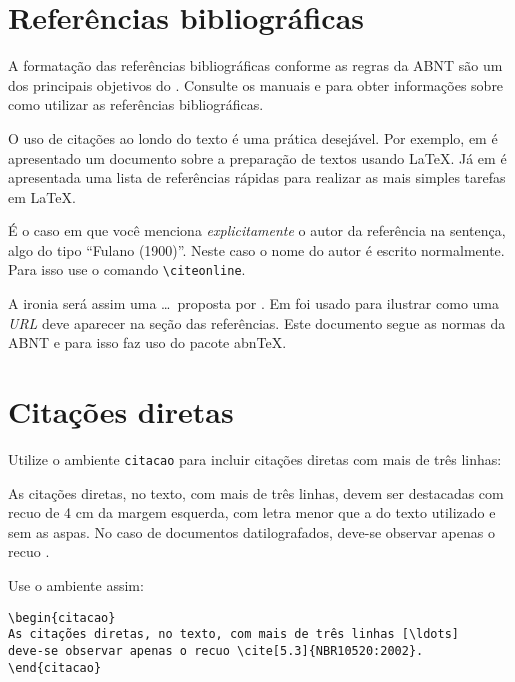 \section{Referências bibliográficas}\label{sec:referencias}

A formatação das referências bibliográficas conforme as regras da ABNT são um dos principais objetivos do \abnTeX. Consulte os manuais  e  para obter informações sobre como utilizar as referências bibliográficas.


O uso de citações ao londo do texto é uma prática desejável. Por exemplo, em \cite{lamport94} é apresentado um documento sobre a preparação de textos usando \LaTeX. Já em \cite{goossens94} é apresentada uma lista de referências rápidas para realizar as mais simples tarefas em \LaTeX.

É o caso em que você menciona \emph{explicitamente} o autor da referência na sentença, algo
do tipo ``Fulano (1900)''. Neste caso o nome do autor é escrito
normalmente. Para isso use o comando \verb+\citeonline+.

A ironia será assim uma \ldots\ proposta  por . Em \cite{exemplo} foi usado para ilustrar como uma \textit{URL} deve aparecer na seção das referências. Este documento segue as normas da \gls{ABNT} e para isso faz uso do pacote \gls{abnTeX}.


\section{Citações diretas}
\label{sec-citacao}

Utilize o ambiente \texttt{citacao} para incluir
citações diretas com mais de três linhas:

\begin{citacao}
    As citações diretas, no texto, com mais de três linhas, devem ser
    destacadas com recuo de 4 cm da margem esquerda, com letra menor que a do texto
    utilizado e sem as aspas. No caso de documentos datilografados, deve-se
    observar apenas o recuo \cite[5.3]{NBR10520:2002}.
\end{citacao}

Use o ambiente assim:

\begin{verbatim}
\begin{citacao}
As citações diretas, no texto, com mais de três linhas [\ldots] 
deve-se observar apenas o recuo \cite[5.3]{NBR10520:2002}.
\end{citacao}
\end{verbatim}

